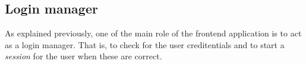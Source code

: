 \subsection{Login manager}
As explained previously, one of the main role of the frontend application is to act 
as a login manager. That is, to check for the user creditentials and to start a 
\emph{session} for the user when these are correct.
